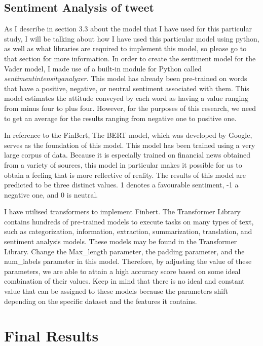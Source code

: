 \documentclass[12pt, a4paper,twoside]{report}
\theoremstyle{plain} %
\theoremstyle{definition} %
\theoremstyle{remark} %
\numberwithin{equation}{chapter}
\begin{document}
    \section{Sentiment Analysis of tweet}
    As I describe in section 3.3 about the model that I have used for this particular study, I will be talking about how I have used this particular model using python, as well as what libraries are required to implement this model, so please go to that section for more information. In order to create the sentiment model for the Vader model, I made use of a built-in module for Python called \textit{sentimentintensityanalyzer}. This model has already been pre-trained on words that have a positive, negative, or neutral sentiment associated with them. This model estimates the attitude conveyed by each word as having a value ranging from minus four to plus four. However, for the purposes of this research, we need to get an average for the results ranging from negative one to positive one.

    In reference to the FinBert, The BERT model, which was developed by Google, serves as the foundation of this model. This model has been trained using a very large corpus of data. Because it is especially trained on financial news obtained from a variety of sources, this model in particular makes it possible for us to obtain a feeling that is more reflective of reality. The results of this model are predicted to be three distinct values. 1 denotes a favourable sentiment, -1 a negative one, and 0 is neutral. 

    I have utilised transformers to implement Finbert. The Transformer Library contains hundreds of pre-trained models to execute tasks on many types of text, such as categorization, information, extraction, summarization, translation, and sentiment analysis models. These models may be found in the Transformer Library. Change the Max\_length parameter, the padding parameter, and the num\_labels parameter in this model. Therefore, by adjusting the value of these parameters, we are able to attain a high accuracy score based on some ideal combination of their values. Keep in mind that there is no ideal and constant value that can be assigned to these models because the parameters shift depending on the specific dataset and the features it contains.

    

\chapter{Final Results}\label{ch:5}
\end{document}

